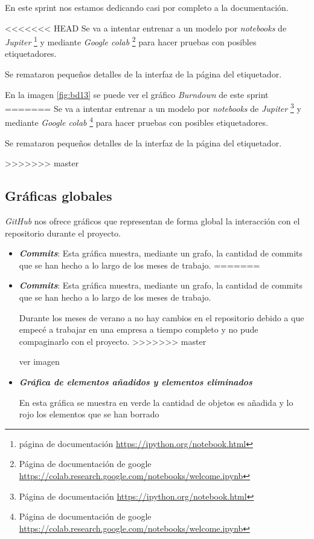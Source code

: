 En este sprint nos estamos dedicando casi por completo a la documentación.

<<<<<<< HEAD
Se va a intentar entrenar a un modelo por \textit{notebooks} de \textit{Jupiter} \footnote{página de documentación \url{https://ipython.org/notebook.html}} y mediante \textit{Google colab} \footnote{Página de documentación de google \url{https://colab.research.google.com/notebooks/welcome.ipynb}} para hacer pruebas con posibles etiquetadores.

Se remataron pequeños detalles de la interfaz de la página del etiquetador.

En la imagen \ref{fig:bd13} se puede ver el gráfico \textit{Burndown} de este sprint
=======
Se va a intentar entrenar a un modelo por \textit{notebooks} de \textit{Jupiter} \footnote{Página de documentación \url{https://ipython.org/notebook.html}} y mediante \textit{Google colab} \footnote{Página de documentación de google \url{https://colab.research.google.com/notebooks/welcome.ipynb}} para hacer pruebas con posibles etiquetadores.

Se remataron pequeños detalles de la interfaz de la página del etiquetador.


>>>>>>> master

\subsection{Gráficas globales}

\textit{GitHub} nos ofrece gráficos que representan de forma global la interacción con el repositorio durante el proyecto. 

\begin{itemize}
<<<<<<< HEAD
	\item \textit{\textbf{Commits}}: Esta gráfica muestra, mediante un grafo, la cantidad de commits que se han hecho a lo largo de los meses de trabajo. 
=======
	\item \textit{\textbf{Commits}}: Esta gráfica muestra, mediante un grafo, la cantidad de commits que se han hecho a lo largo de los meses de trabajo.
	
	Durante los meses de verano a no hay cambios en el repositorio debido a que empecé a trabajar en una empresa a tiempo completo y no pude compaginarlo con el proyecto. 
>>>>>>> master
	
	ver imagen \label{fig: grafo} 
	
	
	\item \textit{\textbf{Gráfica de elementos añadidos y elementos eliminados}}
	
	En esta gráfica se muestra en verde la cantidad de objetos es añadida y lo rojo los elementos que se han borrado
	


	
\end{itemize}
